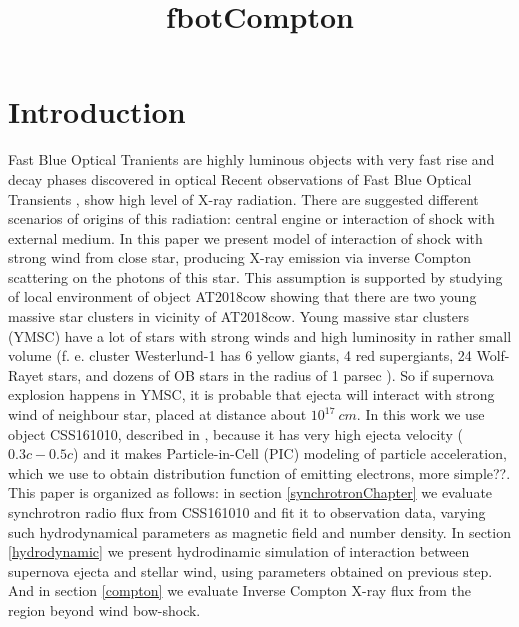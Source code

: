 \documentclass{article}
\title{fbotCompton}
\begin{document}
	
	\section{Introduction}
	Fast Blue Optical Tranients are highly luminous objects with very fast rise and decay 
	phases discovered in optical  
	Recent observations of Fast Blue Optical Transients 
	\cite{Margutti2019, Ho2019cow,Ho2020koala,Coppejans2020, Ho2021at2020, YaoAt2020mrf, MatthewsAT2022tsd, CHrimesAT2023fhn},  show high level of X-ray radiation. There are suggested different scenarios of  origins of this radiation: central engine or interaction of shock with external medium. In this paper we present model of interaction of shock with strong wind from close star, producing X-ray emission via inverse Compton scattering on the photons of this star. This assumption is supported by studying of local environment of object AT2018cow \cite{SunAT2018environment} showing that there are two young massive star clusters in vicinity of AT2018cow. Young massive star clusters (YMSC) have a lot of stars with strong winds and high luminosity in rather small volume (f. e. cluster Westerlund-1 has 6 yellow giants, 4 red supergiants, 24 Wolf-Rayet stars, and dozens of OB stars in the radius of 1 parsec \cite{Clark2005westerlund, Crowther2006westerlund, Negueruela2010westerlund}). So if supernova explosion happens in YMSC, it is probable that ejecta will interact with strong wind of neighbour star, placed at distance about $10^{17}~cm$.  In this work we use object CSS161010, described in \cite{Coppejans2020}, because it has very high ejecta velocity ($0.3 c - 0.5 c$) and it makes Particle-in-Cell (PIC) modeling of particle acceleration, which we use to obtain distribution function of emitting electrons, more simple??. This paper is organized as follows: in section \ref{synchrotronChapter} we evaluate synchrotron radio flux from CSS161010 and fit it to observation data, varying such hydrodynamical parameters as magnetic field and number density. In section \ref{hydrodynamic} we present hydrodinamic simulation of interaction between supernova ejecta and stellar wind, using parameters obtained on previous step. And in section \ref{compton} we evaluate Inverse Compton X-ray flux from the region beyond wind bow-shock.
	
\end{document}

